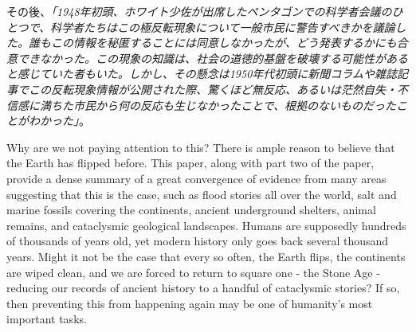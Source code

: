 \documentclass[10pt,twocolumn,letterpaper]{article}
\begin{document}
その後、\textit{「1948年初頭、ホワイト少佐が出席したペンタゴンでの科学者会議のひとつで、科学者たちはこの極反転現象について一般市民に警告すべきかを議論した。誰もこの情報を秘匿することには同意しなかったが、どう発表するかにも合意できなかった。この現象の知識は、社会の道徳的基盤を破壊する可能性があると感じていた者もいた。しかし、その懸念は1950年代初頭に新聞コラムや雑誌記事でこの反転現象情報が公開された際、驚くほど無反応、あるいは茫然自失・不信感に満ちた市民から何の反応も生じなかったことで、根拠のないものだったことがわかった」}\cite{138,139}。

Why are we not paying attention to this? There is ample reason to believe that the Earth has flipped before. This paper, along with part two of the paper, provide a dense summary of a great convergence of evidence from many areas suggesting that this is the case, such as flood stories all over the world, salt and marine fossils covering the continents, ancient underground shelters, animal remains, and cataclysmic geological landscapes. Humans are supposedly hundreds of thousands of years old, yet modern history only goes back several thousand years. Might it not be the case that every so often, the Earth flips, the continents are wiped clean, and we are forced to return to square one - the Stone Age - reducing our records of ancient history to a handful of cataclysmic stories? If so, then preventing this from happening again may be one of humanity's most important tasks.
\end{document}
